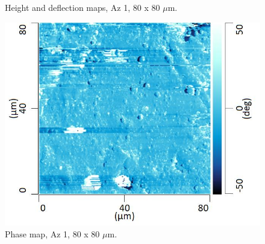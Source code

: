 \begin{figure}[H]
\begin{minipage}{.45\textwidth}
\end{minipage}
\caption[Height and deflection maps, Az 1]{Height and deflection maps, Az 1, 80 x 80 $\mu$m.}
\label{fig:afm_az1_height_def_2}
\end{figure}

\begin{figure}[H]
\centering
  \includegraphics[width=.45\textwidth]{Az1_tapping_mode_240521_phase_4}
\caption[Phase map, Az 1]{Phase map, Az 1, 80 x 80 $\mu$m.}
\label{fig:afm_az1_phase_2}
\end{figure}


